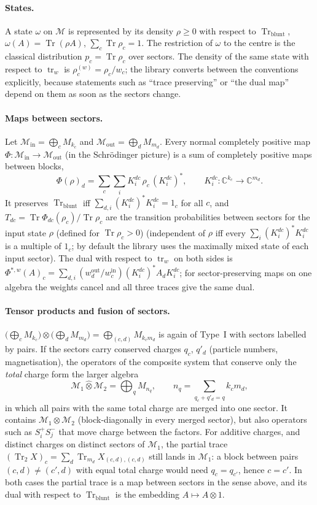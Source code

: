 \documentclass[11pt]{article}
\DeclareMathOperator{\Tr}{Tr}
\newcommand{\C}{\mathbb{C}}
\newcommand{\M}{\mathcal{M}}
\begin{document}
\paragraph{States.} A state $\omega$ on $\M$ is represented by its density $\rho\ge0$ with respect to
$\Tr_{\mathrm{blunt}}$, $\omega(A)=\Tr(\rho A)$, $\sum_c\Tr\rho_c=1$. The restriction of $\omega$ to the
centre is the classical distribution $p_c=\Tr\rho_c$ over sectors. The density of the same state with
respect to $\operatorname{tr}_w$ is $\rho^{(w)}_c=\rho_c/w_c$; the library converts between the
conventions explicitly, because statements such as ``trace preserving'' or ``the dual map'' depend on
them as soon as the sectors change.

\paragraph{Maps between sectors.} Let $\M_{\mathrm{in}}=\bigoplus_c M_{k_c}$ and
$\M_{\mathrm{out}}=\bigoplus_d M_{m_d}$. Every normal completely positive map
$\Phi:\M_{\mathrm{in}}\to\M_{\mathrm{out}}$ (in the Schrödinger picture) is a sum of completely
positive maps between blocks,
\[
  \Phi(\rho)_d=\sum_c\sum_i K^{dc}_i\,\rho_c\,(K^{dc}_i)^*,\qquad K^{dc}_i:\C^{k_c}\to\C^{m_d}.
\]
It preserves $\Tr_{\mathrm{blunt}}$ iff $\sum_{d,i}(K_i^{dc})^*K_i^{dc}=1_c$ for all $c$, and
$T_{dc}=\Tr\Phi_{dc}(\rho_c)/\Tr\rho_c$ are the transition probabilities between sectors for the input
state $\rho$ (defined for $\Tr\rho_c>0$) (independent of $\rho$ iff every $\sum_i(K_i^{dc})^*K_i^{dc}$ is a multiple of $1_c$; by default the
library uses the maximally mixed state of each input sector). The dual
with respect to $\operatorname{tr}_w$ on both sides is
$\Phi^{*,w}(A)_c=\sum_{d,i}(w^{\mathrm{out}}_d/w^{\mathrm{in}}_c)(K_i^{dc})^*A_dK_i^{dc}$; for
sector-preserving maps on one algebra the weights cancel and all three traces give the same dual.

\paragraph{Tensor products and fusion of sectors.} $\bigl(\bigoplus_cM_{k_c}\bigr)\otimes\bigl(\bigoplus_dM_{m_d}\bigr)
=\bigoplus_{(c,d)}M_{k_cm_d}$ is again of Type~I with sectors labelled by pairs. If the sectors carry
conserved charges $q_c$, $q'_d$ (particle numbers, magnetisation), the operators of the composite system
that conserve only the \emph{total} charge form the larger algebra
\[
  \M_1\mathbin{\hat\otimes}\M_2=\bigoplus_q M_{n_q},\qquad n_q=\sum_{q_c+q'_d=q}k_cm_d ,
\]
in which all pairs with the same total charge are merged into one sector. It contains $\M_1\otimes\M_2$
(block-diagonally in every merged sector), but also operators such as $S^+_iS^-_j$ that move charge
between the factors. For additive charges, and distinct charges on distinct sectors of $\M_1$, the partial trace
$(\Tr_2X)_c=\sum_d\Tr_{m_d}X_{(c,d),(c,d)}$ still lands in $\M_1$: a block between pairs $(c,d)\ne(c',d)$ with equal
total charge would need $q_c=q_{c'}$, hence $c=c'$.
In both cases the partial trace is a map between sectors in the sense above, and its dual with respect
to $\Tr_{\mathrm{blunt}}$ is the embedding $A\mapsto A\otimes1$.
\end{document}
